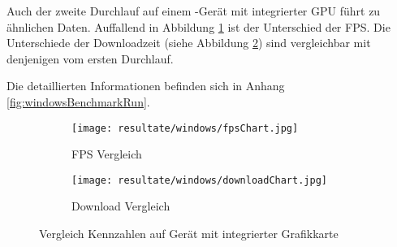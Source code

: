 Auch der zweite Durchlauf auf einem -Gerät mit integrierter \gls{GPU} führt zu ähnlichen Daten. Auffallend in Abbildung \ref{fig:benchmarkFpsChartWindows} ist der Unterschied der \gls{FPS}. Die Unterschiede der Downloadzeit (siehe Abbildung \ref{fig:benchmarkDownloadChartWindows}) sind vergleichbar mit denjenigen vom ersten Durchlauf.

Die detaillierten Informationen befinden sich in Anhang \ref{fig:windowsBenchmarkRun}.

\begin{figure}[H]
  \centering
  \begin{subfigure}{.49\textwidth}
    \centering
    \texttt{[image: resultate/windows/fpsChart.jpg]}
    \caption{\gls{FPS} Vergleich}
    \label{fig:benchmarkFpsChartWindows}
  \end{subfigure}
  \begin{subfigure}{.49\textwidth}
    \centering
    \texttt{[image: resultate/windows/downloadChart.jpg]}
    \caption{Download Vergleich}
    \label{fig:benchmarkDownloadChartWindows}
  \end{subfigure}
  \caption{Vergleich Kennzahlen auf Gerät mit integrierter Grafikkarte}
  \label{fig:benchmarkChartWindows}
\end{figure}

